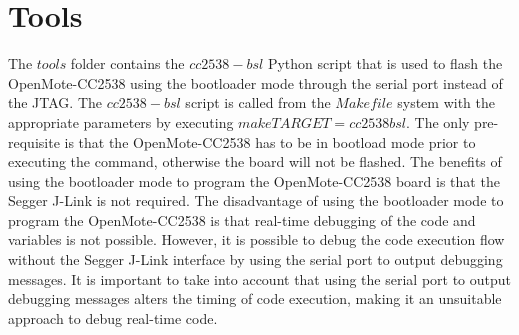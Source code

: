 \section{Tools}
The $tools$ folder contains the $cc2538-bsl$ Python script that is used to flash the OpenMote-CC2538 using the bootloader mode through the serial port instead of the JTAG. The $cc2538-bsl$ script is called from the $Makefile$ system with the appropriate parameters by executing $make TARGET=cc2538 bsl$. The only pre-requisite is that the OpenMote-CC2538 has to be in bootload mode prior to executing the command, otherwise the board will not be flashed. The benefits of using the bootloader mode to program the OpenMote-CC2538 board is that the Segger J-Link is not required. The disadvantage of using the bootloader mode to program the OpenMote-CC2538 is that real-time debugging of the code and variables is not possible. However, it is possible to debug the code execution flow without the Segger J-Link interface by using the serial port to output debugging messages. It is important to take into account that using the serial port to output debugging messages alters the timing of code execution, making it an unsuitable approach to debug real-time code.
